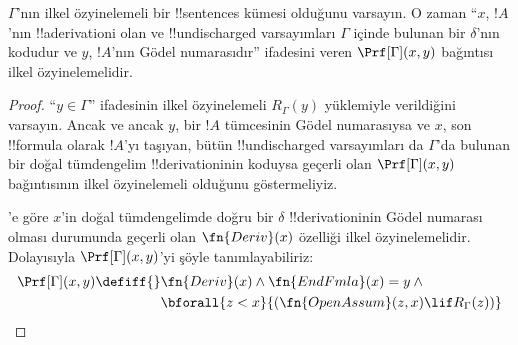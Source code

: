 \begin{prop}
  $\Gamma$'nın ilkel özyinelemeli bir !!{sentence}s kümesi olduğunu varsayın.
  O zaman ``$x$, $!A$'nın !!a{derivation}{}i olan ve !!{undischarged}
  varsayımları $\Gamma$ içinde bulunan bir $\delta$'nın kodudur ve $y$,
  $!A$'nın Gödel
  numarasıdır'' ifadesini veren $\Prf[\Gamma](x, y)$ bağıntısı ilkel
  özyinelemelidir.
\end{prop}

\begin{proof}
  ``$y \in \Gamma$'' ifadesinin ilkel özyinelemeli $R_\Gamma(y)$ yüklemiyle
  verildiğini varsayın. Ancak ve ancak $y$, bir $!A$ tümcesinin Gödel
  numarasıysa ve $x$, son !!{formula} olarak $!A$'yı taşıyan, bütün !!{undischarged}
  varsayımları da $\Gamma$'da bulunan bir doğal tümdengelim !!{derivation}{}inin
  koduysa geçerli olan $\Prf[\Gamma](x, y)$ bağıntısının ilkel
  özyinelemeli olduğunu göstermeliyiz.

  'e göre $x$'in doğal tümdengelimde doğru bir $\delta$
  !!{derivation}{}inin Gödel numarası olması durumunda geçerli olan
  $\fn{Deriv}(x)$ özelliği ilkel özyinelemelidir. Dolayısıyla
  $\Prf[\Gamma](x, y)$'yi şöyle tanımlayabiliriz:
  \begin{align*}
    \Prf[\Gamma](x, y) \defiff {}
    & \fn{Deriv}(x) \land \fn{EndFmla}(x) = y \land {} \\
    & \bforall{z < x}{(\fn{OpenAssum}(z, x) \lif R_\Gamma(z))}
  \end{align*}
\end{proof}

